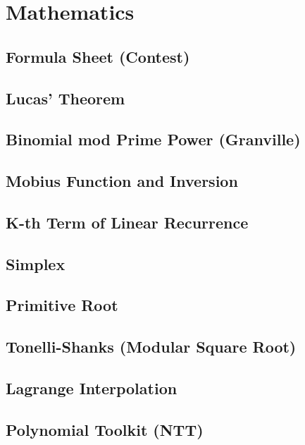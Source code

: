 \documentclass[10pt,letterpaper,landscape,twocolumn]{article}
\begin{document}
\section{Mathematics}
\subsection{Formula Sheet (Contest)}
\subsection{Lucas' Theorem}

\subsection{Binomial mod Prime Power (Granville)}

\subsection{Mobius Function and Inversion}

\subsection{K-th Term of Linear Recurrence}

\subsection{Simplex}

\subsection{Primitive Root}

\subsection{Tonelli-Shanks (Modular Square Root)}

\subsection{Lagrange Interpolation}

\subsection{Polynomial Toolkit (NTT)}

\end{document}
